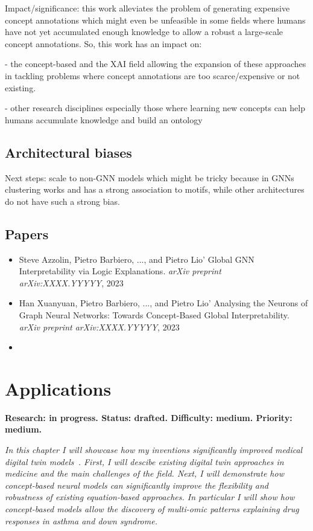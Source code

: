 \documentclass[withindex,glossary]{cam-thesis}
\begin{document}
Impact/significance: this work alleviates the problem of generating expensive concept annotations which might even be unfeasible in some fields where humans have not yet accumulated enough knowledge to allow a robust a large-scale concept annotations. So, this work has an impact on:

- the concept-based and the XAI field allowing the expansion of these approaches in tackling problems where concept annotations are too scarce/expensive or not existing.

- other research disciplines especially those where learning new concepts can help humans accumulate knowledge and build an ontology

\section{Architectural biases}
Next steps: scale to non-GNN models which might be tricky because in GNNs clustering works and has a strong association to motifs, while other architectures do not have such a strong bias.

\section*{Papers}
\nobibliography*
\begin{itemize}
    \item Steve Azzolin, Pietro Barbiero, ..., and Pietro Lio' Global GNN Interpretability via Logic Explanations. \textit{arXiv preprint arXiv:XXXX.YYYYY}, 2023
    \item Han Xuanyuan, Pietro Barbiero, ..., and Pietro Lio' Analysing the Neurons of Graph Neural Networks: Towards Concept-Based Global Interpretability. \textit{arXiv preprint arXiv:XXXX.YYYYY}, 2023
    \item {}
\end{itemize}



\chapter{Applications} \label{chapter:applications}
\textbf{Research: in progress. Status: drafted. Difficulty: medium. Priority: medium.}

\textit{In this chapter I will showcase how my inventions significantly improved medical digital twin models~\citep{laubenbacher2021using}. First, I will descibe existing digital twin approaches in medicine and the main challenges of the field. Next, I will demonstrate how concept-based neural models can significantly improve the flexibility and robustness of existing equation-based approaches. In particular I will show how concept-based models allow the discovery of multi-omic patterns explaining drug responses in asthma and down syndrome.}
\end{document}
